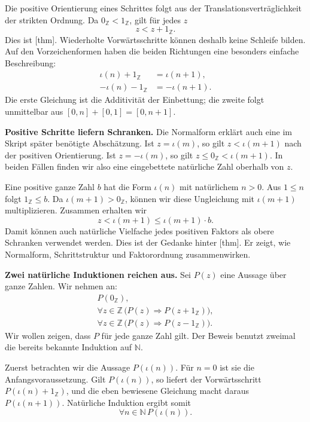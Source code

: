 Die positive Orientierung eines Schrittes folgt aus der
Translationsverträglichkeit der strikten Ordnung. Da
\(0_{\mathbb Z}<1_{\mathbb Z}\), gilt für jedes \(z\)
\[
  z<z+1_{\mathbb Z}.
\]
Dies ist [thm]. Wiederholte
Vorwärtsschritte können deshalb keine Schleife bilden. Auf den
Vorzeichenformen haben die beiden Richtungen eine besonders einfache
Beschreibung:
\[
  \begin{aligned}
    \iota(n)+1_{\mathbb Z}&=\iota(n+1),\\
    -\iota(n)-1_{\mathbb Z}&=-\iota(n+1).
  \end{aligned}
\]
Die erste Gleichung ist die Additivität der Einbettung; die zweite
folgt unmittelbar aus \([0,n]+[0,1]=[0,n+1]\).

\IntegersTwoRays

\medskip\noindent\textbf{Positive Schritte liefern Schranken.}
Die Normalform erklärt auch eine im Skript später benötigte
Abschätzung. Ist \(z=\iota(m)\), so gilt
\(z<\iota(m+1)\) nach der positiven Orientierung. Ist
\(z=-\iota(m)\), so gilt
\(z\leq0_{\mathbb Z}<\iota(m+1)\). In beiden Fällen finden
wir also eine eingebettete natürliche Zahl oberhalb von \(z\).

Eine positive ganze Zahl \(b\) hat die Form \(\iota(n)\)
mit natürlichem \(n>0\). Aus \(1\leq n\) folgt
\(1_{\mathbb Z}\leq b\). Da \(\iota(m+1)>0_{\mathbb Z}\),
können wir diese Ungleichung mit \(\iota(m+1)\) multiplizieren.
Zusammen erhalten wir
\[
  z<\iota(m+1)\leq\iota(m+1)\cdot b.
\]
Damit können auch natürliche Vielfache jedes positiven Faktors
als obere Schranken verwendet werden. Dies ist der Gedanke hinter
[thm]. Er zeigt,
wie Normalform, Schrittstruktur und Faktorordnung zusammenwirken.

\medskip\noindent\textbf{Zwei natürliche Induktionen reichen aus.}
Sei \(P(z)\) eine Aussage über ganze Zahlen. Wir nehmen an:
\[
  \begin{gathered}
    P(0_{\mathbb Z}),\\
    \forall z\in\mathbb Z\,
      \bigl(P(z)\Longrightarrow P(z+1_{\mathbb Z})\bigr),\\
    \forall z\in\mathbb Z\,
      \bigl(P(z)\Longrightarrow P(z-1_{\mathbb Z})\bigr).
  \end{gathered}
\]
Wir wollen zeigen, dass \(P\) für jede ganze Zahl gilt.
Der Beweis benutzt zweimal die bereits bekannte Induktion auf
\(\mathbb N\).

Zuerst betrachten wir die Aussage \(P(\iota(n))\). Für \(n=0\)
ist sie die Anfangsvoraussetzung. Gilt \(P(\iota(n))\), so liefert
der Vorwärtsschritt \(P(\iota(n)+1_{\mathbb Z})\), und die
eben bewiesene Gleichung macht daraus \(P(\iota(n+1))\).
Natürliche Induktion ergibt somit
\[
  \forall n\in\mathbb N\,P(\iota(n)).
\]

